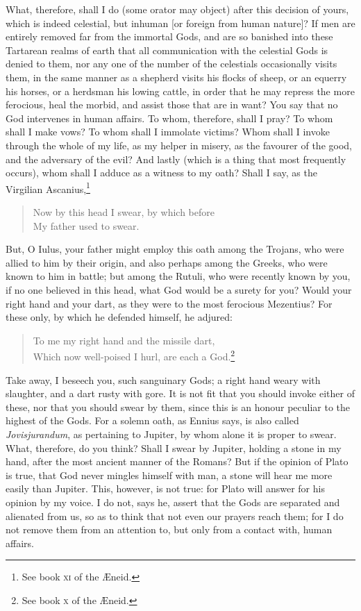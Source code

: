 \documentclass[12pt]{article}
\begin{document}
What, therefore, shall I do (some orator may object) after this decision of
yours, which is indeed celestial, but inhuman [or foreign from human nature]?
If men are entirely removed far from the immortal Gods, and are so banished
into these Tartarean realms of earth that all communication with the celestial
Gods is denied to them, nor any one of the number of the celestials
occasionally visits them, in the same manner as a shepherd visits his flocks of
sheep, or an equerry his horses, or a herdsman his lowing cattle, in order that
he may repress the more ferocious, heal the morbid, and assist those that are
in want? You say that no God intervenes in human affairs. To whom, therefore,
shall I pray? To whom shall I make vows? To whom shall I immolate victims? Whom
shall I invoke through the whole of my life, as my helper in misery, as the
favourer of the good, and the adversary of the evil? And lastly (which is a
thing that most frequently occurs), whom shall I adduce as a witness to my
oath? Shall I say, as the Virgilian Ascanius,\footnote{See book \textsc{xi} of
the {\AE}neid.}

\begin{verse}
Now by this head I swear, by which before\\
My father used to swear.
\end{verse}

\noindent But, O Iulus, your father might employ this oath among the Trojans,
who were allied to him by their origin, and also perhaps among the Greeks, who
were known to him in battle; but among the Rutuli, who were recently known by
you, if no one believed in this head, what God would be a surety for you? Would
your right hand and your dart, as they were to the most ferocious Mezentius?
For these only, by which he defended himself, he adjured:

\begin{verse}
To me my right hand and the missile dart,\\
Which now well-poised I hurl, are each a God.\footnote{See book \textsc{x} of
the {\AE}neid.}
\end{verse}

\noindent Take away, I beseech you, such sanguinary Gods; a right hand weary
with slaughter, and a dart rusty with gore. It is not fit that you should
invoke either of these, nor that you should swear by them, since this is an
honour peculiar to the highest of the Gods. For a solemn oath, as Ennius says,
is also called \textit{Jovisjurandum}, as pertaining to Jupiter, by whom alone
it is proper to swear. What, therefore, do you think? Shall I swear by Jupiter,
holding a stone in my hand, after the most ancient manner of the Romans? But if
the opinion of Plato is true, that God never mingles himself with man, a stone
will hear me more easily than Jupiter. This, however, is not true: for Plato
will answer for his opinion by my voice. I do not, says he, assert that the
Gods are separated and alienated from us, so as to think that not even our
prayers reach them; for I do not remove them from an attention to, but only
from a contact with, human affairs.
\end{document}
